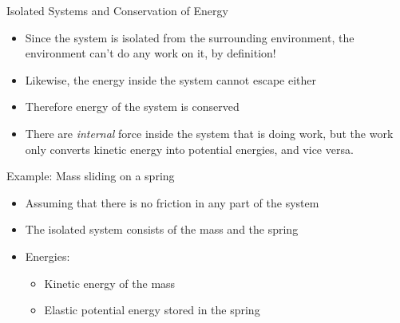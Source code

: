 \documentclass[12pt,compress,aspectratio=169]{beamer}
\begin{document}
\begin{frame}{Isolated Systems and Conservation of Energy}
  \begin{itemize}
  \item Since the system is isolated from the surrounding environment, the
    environment can't do any work on it, by definition!
  \item Likewise, the energy inside the system cannot escape either
  \item Therefore energy of the system is conserved
  \item There are \emph{internal} force inside the system that is doing work,
    but the work only converts kinetic energy into potential energies, and vice
    versa.
  \end{itemize}
\end{frame}



\begin{frame}{Example: Mass sliding on a spring}
  \begin{itemize}
  \item Assuming that there is no friction in any part of the system
  \item The isolated system consists of the mass and the spring 
  \item Energies:
    \begin{itemize}
    \item Kinetic energy of the mass
    \item Elastic potential energy stored in the spring
    \end{itemize}
  \end{itemize}
  \begin{center}
  \end{center}
\end{frame}
\end{document}
